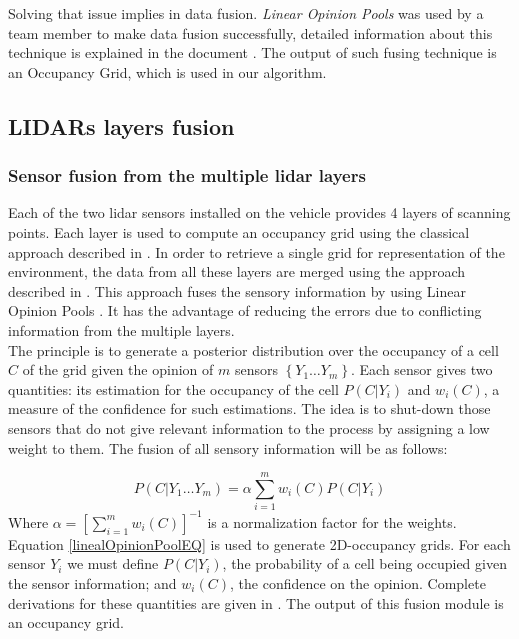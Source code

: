Solving that issue implies in data fusion. \textit{Linear Opinion Pools} was used by a team member to make data fusion successfully, detailed information about this technique is explained in the document \cite{ADARVE-2012-671211}. The output of such fusing technique is an Occupancy Grid, which is used in our algorithm.

\subsection{LIDARs layers fusion}

\subsubsection{Sensor fusion from the multiple lidar layers}
Each of the  two lidar sensors installed on the vehicle provides 4 layers of scanning points. Each layer is used to compute an occupancy grid using the classical approach described in \cite{Thrun05}. In order to retrieve a single grid for representation of the environment, the data from all these layers are merged using the approach described in \cite{ADARVE-2012-671211}. This approach fuses the sensory information by using Linear Opinion Pools \cite{DeGroot1974}. It has the advantage of reducing the errors due to conflicting information from the multiple layers.\\
The principle is to generate a posterior distribution over the occupancy of a cell $C$ of the grid given the opinion of $m$ sensors $\left\{ Y_1 \dots Y_m \right\}$.
Each sensor gives two quantities: its estimation for the occupancy of the cell $P(C | Y_i)$ and $w_i(C)$, a measure of the confidence for such estimations.
The idea is to shut-down those sensors that do not give relevant information to the process by assigning a low weight to them. The fusion of all sensory information will be as follows:

\begin{equation}
\label{linealOpinionPoolEQ}
  P(C | Y_1 \dots Y_m) = \alpha \sum \limits^m_{i=1} w_i(C) P(C | Y_i)
\end{equation}
Where $\alpha = \left[ \sum \limits^m_{i=1} w_i(C) \right]^{-1}$ is a normalization factor for the weights.  Equation \eqref{linealOpinionPoolEQ} is used to generate
2D-occupancy grids. For each sensor $Y_i$ we must define $P(C | Y_i)$, the probability of a cell being occupied given the sensor information; and $w_i(C)$, the confidence on the opinion. Complete derivations for these quantities are given in \cite{ADARVE-2012-671211}. The output of this fusion module is an occupancy grid. %

